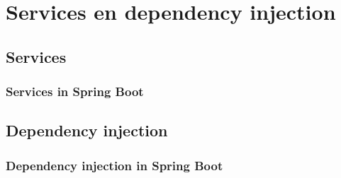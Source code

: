 \chapter{Services en dependency injection}

\section{Services}
\subsection{Services in Spring Boot}

\section{Dependency injection}
\subsection{Dependency injection in Spring Boot}